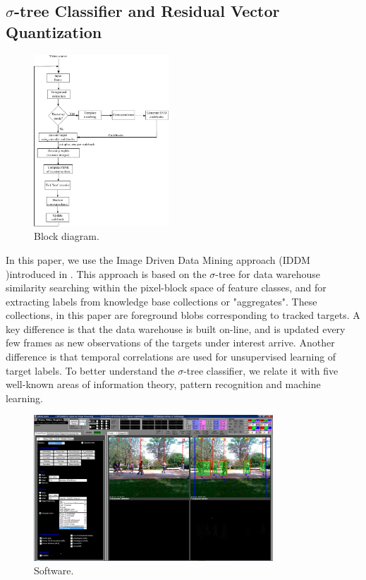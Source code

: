 \documentclass{article}
\begin{document}
\subsection{$\sigma$-tree Classifier and Residual Vector Quantization}
\begin{figure}[t]
	\centering
	\includegraphics[width=0.45\textwidth]{figs/RVQ_TRK_IPCV2010_BlockDiagram}
	\caption{Block diagram.} 	
	\label{fig:block_diagram}	
\end{figure}

In this paper, we use the Image Driven Data Mining approach (IDDM )introduced in \cite{2007_JNL_IDDM_Barnes}.  This approach is based on the $\sigma$-tree for data warehouse similarity searching within the pixel-block space of feature classes, and for extracting labels from knowledge base collections or "aggregates".  These collections, in this paper are foreground blobs corresponding to tracked targets.  A key difference is that the data warehouse is built on-line, and is updated every few frames as new observations of the targets under interest arrive.  Another difference is that temporal correlations are used for unsupervised learning of target labels.  To better understand the $\sigma$-tree classifier, we relate it with five well-known areas of information theory, pattern recognition and machine learning.  

\begin{figure}
	\centering
	\includegraphics[width=0.8\textwidth]{figs/RVQ_TRK_IPCV2010_snapshot_VVG_ECE8833_FN_00002}
	\caption{Software.} 	
	\label{fig:snapshot_VVG}	
\end{figure}
\end{document}
